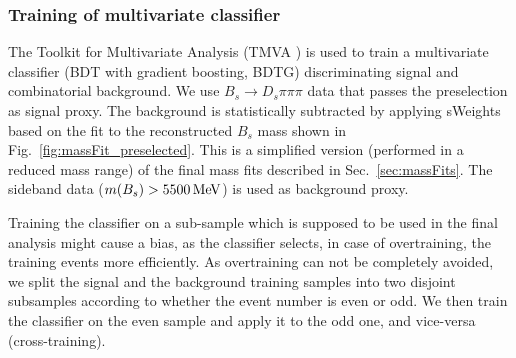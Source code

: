 \clearpage
\subsubsection{Training of multivariate classifier}

The Toolkit for Multivariate Analysis (TMVA \cite{Hocker:2007ht}) is used to train a multivariate classifier (BDT with gradient boosting, BDTG)
discriminating signal and combinatorial background.
We use $B_s\to D_s\pi\pi\pi$ data that passes the preselection as signal proxy. 
The background is statistically subtracted by applying \textsf{sWeights} based on the fit to the reconstructed $B_s$ mass shown in Fig.~\ref{fig:massFit_preselected}.
This is a simplified version (performed in a reduced mass range) of the final mass fits described in Sec.~\ref{sec:massFits}.
The sideband data ($m(B_s) > 5500 \mathrm{\,Me\kern -0.1em V}$) is used as background proxy.

Training the classifier on a sub-sample which is supposed to be used in the
final analysis might cause a bias, as the classifier selects, in case of overtraining,  the training events more efficiently. 
As overtraining can not be completely avoided, we split the signal and
the background training samples into two disjoint subsamples according to whether the
event number is even or odd. We then train the classifier on the even sample and apply
it to the odd one, and vice-versa (cross-training).

